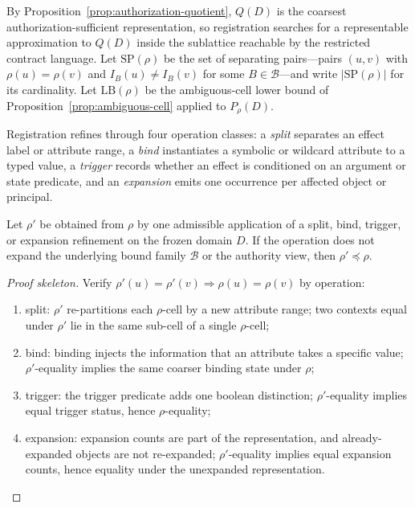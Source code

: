 By Proposition~\ref{prop:authorization-quotient}, $Q(D)$ is the coarsest
authorization-sufficient representation, so registration searches for a
representable approximation to $Q(D)$ inside the sublattice reachable by the
restricted contract language. Let $\mathrm{SP}(\rho)$ be the set of separating
pairs---pairs $(u,v)$ with $\rho(u)=\rho(v)$ and $I_B(u)\neq I_B(v)$ for some
$B\in\mathcal{B}$---and write $|\mathrm{SP}(\rho)|$ for its cardinality. Let
$\mathrm{LB}(\rho)$ be the ambiguous-cell lower bound of
Proposition~\ref{prop:ambiguous-cell} applied to $P_\rho(D)$.

Registration refines through four operation classes: a \emph{split} separates
an effect label or attribute range, a \emph{bind} instantiates a symbolic or
wildcard attribute to a typed value, a \emph{trigger} records whether an
effect is conditioned on an argument or state predicate, and an
\emph{expansion} emits one occurrence per affected object or principal.

\begin{proposition}
\label{prop:refinement-operations}
Let $\rho'$ be obtained from $\rho$ by one admissible application of a split,
bind, trigger, or expansion refinement on the frozen domain $D$. If the
operation does not expand the underlying bound family $\mathcal{B}$ or the
authority view, then $\rho'\preceq\rho$.
\end{proposition}

\begin{proof}[Proof skeleton]
Verify $\rho'(u)=\rho'(v)\Rightarrow\rho(u)=\rho(v)$ by operation:
\begin{enumerate}
  \item split: $\rho'$ re-partitions each $\rho$-cell by a new attribute
        range; two contexts equal under $\rho'$ lie in the same sub-cell of a
        single $\rho$-cell;
  \item bind: binding injects the information that an attribute takes a
        specific value; $\rho'$-equality implies the same coarser binding
        state under $\rho$;
  \item trigger: the trigger predicate adds one boolean distinction;
        $\rho'$-equality implies equal trigger status, hence $\rho$-equality;
  \item expansion: expansion counts are part of the representation, and
        already-expanded objects are not re-expanded; $\rho'$-equality implies
        equal expansion counts, hence equality under the unexpanded
        representation. \qedhere
\end{enumerate}
\end{proof}

